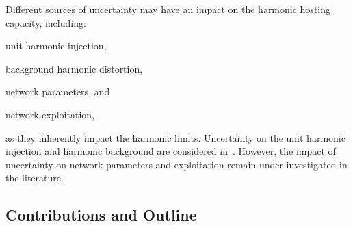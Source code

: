 Different sources of uncertainty may have an impact on the harmonic hosting capacity, including: 
\begin{enumerate*}
    \item [(a)] unit harmonic injection,
    \item [(b)] background harmonic distortion,
    \item [(c)] network parameters, and
    \item [(d)] network exploitation, 
\end{enumerate*}
as they inherently impact the harmonic limits. Uncertainty on the unit harmonic injection and harmonic background are considered in~\cite{ sun_distribution_2022, nakhodchi_impact_2023, sakar_integration_2018, sun_distribution_2012, sun_incorporating_2012}. However, the impact of uncertainty on network parameters and exploitation remain under-investigated in the literature.

\subsection{Contributions and Outline}
\label{sec:contribution_and_outline}


